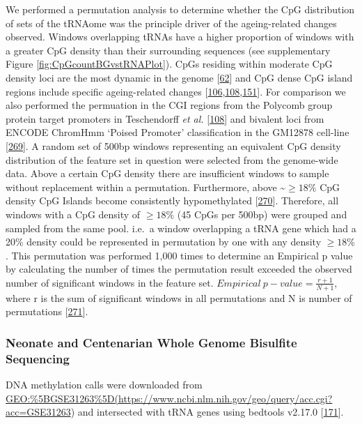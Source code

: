 \documentclass[
]{book}
\begin{document}
We performed a permutation analysis to determine whether the CpG distribution of sets of the tRNAome was the principle driver of the ageing-related changes observed.
Windows overlapping tRNAs have a higher proportion of windows with a greater CpG density than their surrounding sequences (see supplementary Figure \ref{fig:CpGcountBGvstRNAPlot}).
CpGs residing within moderate CpG density loci are the most dynamic in the genome {[}\protect\hyperlink{ref-Ziller2013}{62}{]} and CpG dense CpG island regions include specific ageing-related changes {[}\protect\hyperlink{ref-Rakyan2010}{106},\protect\hyperlink{ref-Teschendorff2010}{108},\protect\hyperlink{ref-Bell2016}{151}{]}.
For comparison we also performed the permuation in the CGI regions from the Polycomb group protein target promoters in Teschendorff \emph{et al.} {[}\protect\hyperlink{ref-Teschendorff2010}{108}{]} and bivalent loci from ENCODE ChromHmm `Poised Promoter' classification in the GM12878 cell-line {[}\protect\hyperlink{ref-Ernst2011}{269}{]}.
A random set of 500bp windows representing an equivalent CpG density distribution of the feature set in question were selected from the genome-wide data.
Above a certain CpG density there are insufficient windows to sample without replacement within a permutation.
Furthermore, above \textasciitilde{}\(\ge18\%\) CpG density CpG Islands become consistently hypomethylated {[}\protect\hyperlink{ref-Bell2012a}{270}{]}.
Therefore, all windows with a CpG density of \(\ge18\%\) (45 CpGs per 500bp) were grouped and sampled from the same pool.
i.e.~a window overlapping a tRNA gene which had a 20\% density could be represented in permutation by one with any density \(\ge18\%\).
This permutation was performed 1,000 times to determine an Empirical p value by calculating the number of times the permutation result exceeded the observed number of significant windows in the feature set.
\(Empirical~p-value = \frac{r+1}{N+1}\), where r is the sum of significant windows in all permutations and N is number of permutations {[}\protect\hyperlink{ref-North2003}{271}{]}.

\hypertarget{neonate-and-centenarian-whole-genome-bisulfite-sequencing}{%
\subsubsection{Neonate and Centenarian Whole Genome Bisulfite Sequencing}\label{neonate-and-centenarian-whole-genome-bisulfite-sequencing}}

DNA methylation calls were downloaded from \url{GEO:\%5BGSE31263\%5D(https://www.ncbi.nlm.nih.gov/geo/query/acc.cgi?acc=GSE31263}) and intersected with tRNA genes using bedtools v2.17.0 {[}\protect\hyperlink{ref-Quinlan2010}{171}{]}.
\end{document}
